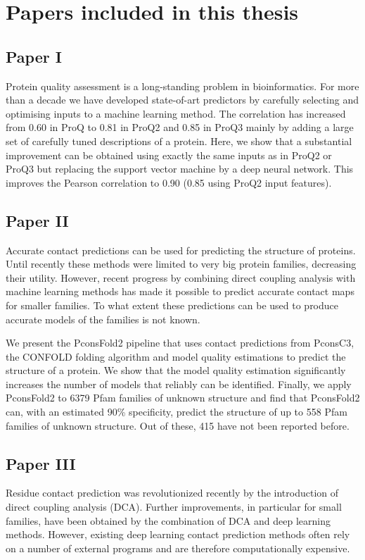 \chapter{Papers included in this thesis}


\section{Paper I}
Protein quality assessment is a long-standing problem in bioinformatics. For more than a decade we have developed state-of-art predictors by carefully selecting and optimising inputs to a machine learning method. The correlation has increased from 0.60 in ProQ to 0.81 in ProQ2 and 0.85 in ProQ3 mainly by adding a large set of carefully tuned descriptions of a protein. Here, we show that a substantial improvement can be obtained using exactly the same inputs as in ProQ2 or ProQ3 but replacing the support vector machine by a deep neural network. This improves the Pearson correlation to 0.90 (0.85 using ProQ2 input features).

\section{Paper II}

Accurate contact predictions can be used for predicting the structure of proteins. Until recently these methods were limited to very big protein families, decreasing their utility. However, recent progress by combining direct coupling analysis with machine learning methods has made it possible to predict accurate contact maps for smaller families. To what extent these predictions can be used to produce accurate models of the families is not known.

We present the PconsFold2 pipeline that uses contact predictions from PconsC3, the CONFOLD folding algorithm and model quality estimations to predict the structure of a protein. We show that the model quality estimation significantly increases the number of models that reliably can be identified. Finally, we apply PconsFold2 to 6379 Pfam families of unknown structure and find that PconsFold2 can, with an estimated 90\% specificity, predict the structure of up to 558 Pfam families of unknown structure. Out of these, 415 have not been reported before.

\section{Paper III}
Residue contact prediction was revolutionized recently by the introduction of direct coupling analysis (DCA). Further improvements, in particular for small families, have been obtained by the combination of DCA and deep learning methods. However, existing deep learning contact prediction methods often rely on a number of external programs and are therefore computationally expensive.


